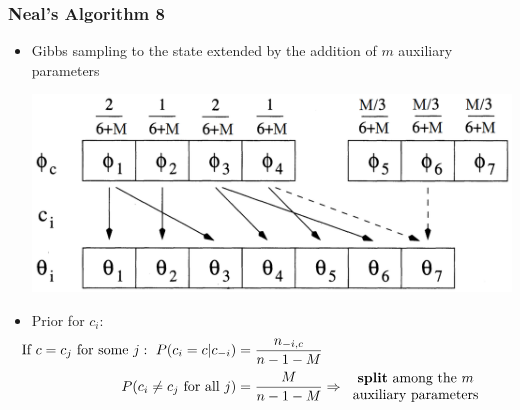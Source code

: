\begin{frame} %
	\frametitle{Neal's Algorithm 8}
	\begin{itemize}
		\item Gibbs sampling to the state extended by the addition of $m$ auxiliary parameters \\
        \begin{center}
        	\includegraphics[scale=0.35]{etc/neal8.png}
        \end{center}
		
        \item Prior for $c_{i}$:
            \begin{align*}
            \hspace{-25pt}
            \vspace{-10pt}
                \text{If} \ c=c_{j} \ \text{for some } j: \ P(c_{i}=c | c_{-i}) &= \frac{n_{-i,c}}{n-1-M}  \\
                P(c_{i}\neq c_{j} \text{ for all } j) &=\frac{M }{n-1-M}  \Rightarrow 
                \begin{tabular}{c}
                \textbf{split} among the $m$ \\
                auxiliary parameters 
                \end{tabular}
            \end{align*}	
	\end{itemize}
\end{frame}




